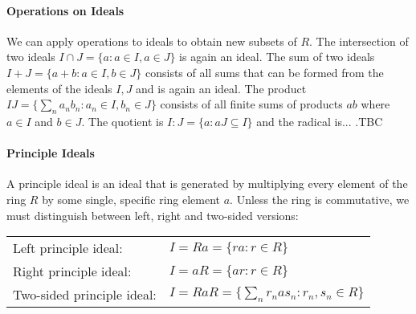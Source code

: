 
\paragraph{Operations on Ideals} We can apply operations to ideals to obtain new subsets of $R$. The intersection of two ideals $I \cap J = \{a : a \in I, a \in J\}$ is again an ideal. The sum of two ideals $I + J = \{a + b : a \in I, b \in J\}$ consists of all sums that can be formed from the elements of the ideals $I,J$ and is again an ideal. The product $I J = \{\sum_n a_n b_n : a_n \in I, b_n \in J\}$ consists of all finite sums of products $a b$ where $a \in I$ and $b \in J$. The quotient is $I:J =  \{a : a J \subseteq I\}$ and the radical is... .TBC












\paragraph{Principle Ideals} A principle ideal is an ideal that is generated by multiplying every element of the ring $R$ by some single, specific ring element $a$. Unless the ring is commutative, we must distinguish between left, right and two-sided versions:

\medskip
\begin{tabular}{l l}
Left principle ideal:      & $I = R a = \{ r a : r \in R \}$ \\
Right principle ideal:     & $I = a R = \{ a r : r \in R \}$ \\
Two-sided principle ideal: & $I = RaR = \{ \sum_n r_n a s_n : r_n,s_n \in R \} $ \\
\end{tabular}
\medskip

